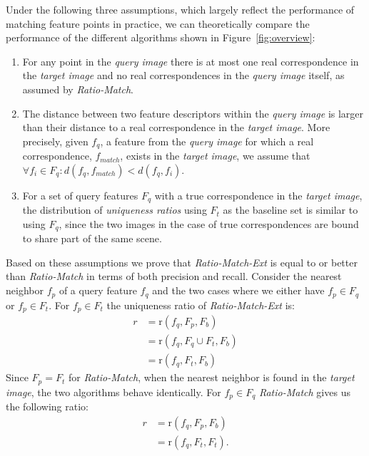 \documentclass[review]{elsarticle}
\begin{document}
Under the following three assumptions, which largely reflect the performance of matching feature points in practice, we can theoretically compare the performance of the different algorithms shown in Figure~\ref{fig:overview}:
\begin{enumerate}
    \item{For any point in 
        the \emph{query image} there is at most one real correspondence in the 
    \emph{target image} and no real correspondences in the \emph{query image} itself, 
as assumed by \emph{Ratio-Match}.}
    \item{The distance between two feature descriptors within the \emph{query image} is larger than their distance to a real correspondence in the \emph{target image}.  More precisely, given $f_q$, a feature from the \emph{query image} for which a real correspondence, $f_{match}$, exists in the \emph{target image}, we assume that $\forall f_i \in F_{q}: d(f_q,f_{match}) < d(f_q, f_i)$.}
     \item{For a set of query features $F_{q}$ with a true 
             correspondence in the \emph{target image}, 
             the distribution of \emph{uniqueness ratios} using $F_{t}$ as 
             the baseline set is similar to using $F_{q}$, since the 
         two images in the case of true correspondences are bound 
     to share part of the same scene.}
    \end{enumerate}

Based on these assumptions we prove that \emph{Ratio-Match-Ext} is equal to or better than \emph{Ratio-Match} in terms of both precision and recall.  Consider the nearest neighbor $f_{p}$ of a query feature $f_{q}$ and the two cases where we either have $f_{p} \in F_{q}$ or $f_{p} \in F_{t}$. For $f_{p} \in F_{t}$ the uniqueness ratio of \emph{Ratio-Match-Ext} is:
\begin{align*}
    r &= \text{r}(f_{q}, F_{p}, F_{b}) \\
        &= \text{r}(f_{q}, F_{q} \cup F_{t}, F_{b})\\
        &= \text{r}(f_{q}, F_{t}, F_{b})
\end{align*}
Since $F_{p} = F_{t}$ for \emph{Ratio-Match}, when the nearest neighbor is found in the \emph{target image}, the two algorithms behave identically. For $f_{p} \in F_{q}$ \emph{Ratio-Match} gives us the following ratio:
\begin{align*}
    r &= \text{r}(f_{q}, F_{p}, F_{b}) \\
        &= \text{r}(f_{q}, F_{t}, F_{t}).
\end{align*}
\end{document}

